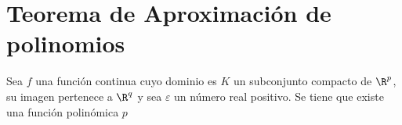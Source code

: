 %

\chapter{Teorema de Aproximación de polinomios }\label{ch:ApriximacionPolinomios}

Sea $f$ una función continua cuyo dominio es $K$ un subconjunto compacto de $\R^p$, su imagen pertenece a $\R^q$  y sea $\varepsilon$ un número real positivo.
Se  tiene que existe una función polinómica $p$   

\endinput